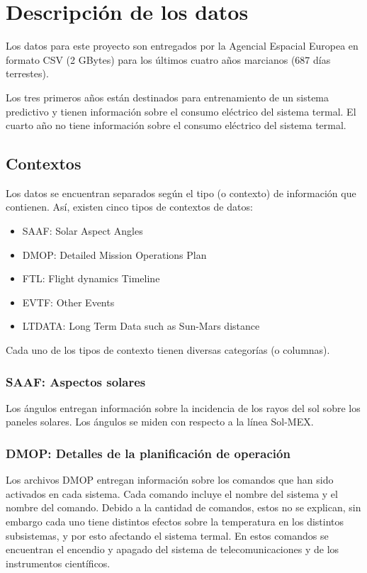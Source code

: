 \documentclass[../Main.tex]{subfiles}
\begin{document}
\section*{Descripción de los datos}

Los datos para este proyecto son entregados por la Agencial Espacial Europea en formato CSV (2 GBytes) para los últimos cuatro años marcianos (687 días terrestes).
\newline \par
Los tres primeros años están destinados para entrenamiento de un sistema predictivo y tienen información sobre el consumo eléctrico del sistema termal. El cuarto año no tiene información sobre el consumo eléctrico del sistema termal.
\subsection*{Contextos}
Los datos se encuentran separados según el tipo (o contexto) de información que contienen. Así, existen cinco tipos de contextos de datos:
\begin{itemize}
    \item SAAF: Solar Aspect Angles
    \item DMOP: Detailed Mission Operations Plan
    \item FTL: Flight dynamics Timeline
    \item EVTF: Other Events
    \item LTDATA: Long Term Data such as Sun-Mars distance
\end{itemize}

Cada uno de los tipos de contexto tienen diversas categorías (o columnas).
\subsubsection*{SAAF: Aspectos solares}
Los ángulos entregan información sobre la incidencia de los rayos del sol sobre los paneles solares. Los ángulos se miden con respecto a la línea Sol-MEX.
\subsubsection*{DMOP: Detalles de la planificación de operación}
Los archivos DMOP entregan información sobre los comandos que han sido activados en cada sistema. Cada comando incluye el nombre del sistema y el nombre del comando. Debido a la cantidad de comandos, estos no se explican, sin embargo cada uno tiene distintos efectos sobre la temperatura en los distintos subsistemas, y por esto afectando el sistema termal. En estos comandos se encuentran el encendio y apagado del sistema de telecomunicaciones y de los instrumentos científicos.
\end{document}
